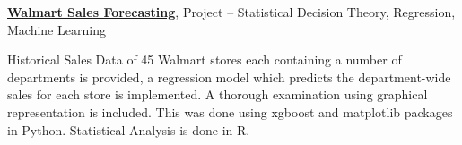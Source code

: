 \documentclass[letterpaper,MMMyyyy,nonstopmode]{simpleresumecv}
\begin{document}
\begin{Body}
\BigGap
\Entry
\href{https://tejasreddy9.github.io/wssforecast/}
{\textbf{Walmart Sales Forecasting}},
Project
\hfill
{} --
\Gap
\BulletItem
Statistical Decision Theory, Regression, Machine Learning
\begin{Detail}
\SubBulletItem
Historical Sales Data of 45 Walmart stores each containing a number of departments is provided, a regression model which predicts the department-wide sales for each store is implemented. A thorough examination using graphical representation is included.
\SubBulletItem
This was done using xgboost and matplotlib packages in Python. Statistical Analysis is done in R.
\end{Detail}
















\end{Body}
\end{document}
